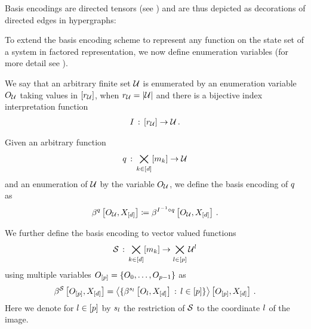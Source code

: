 Basis encodings are directed tensors (see ) and are thus depicted as decorations of directed edges in hypergraphs:
\begin{center}
	
\end{center}

To extend the basis encoding scheme to represent any function on the state set of a system in factored representation, we now define enumeration variables (for more detail see ).

\begin{definition}\label{def:indexinterpretationNotation}
    We say that an arbitrary finite set $\mathcal{U}$ is enumerated by an enumeration variable $O_{\mathcal{U}}$ taking values in $[r_{\mathcal{U}}]$, when $r_{\mathcal{U}}=\left|\mathcal{U}\right|$ and there is a bijective index interpretation function
    \begin{align*}
        I \,:\, [r_{\mathcal{U}}] \rightarrow \mathcal{U} \, .
    \end{align*}
\end{definition}

Given an arbitrary function
\begin{align*}
	q \,:\, \bigtimes_{k\in[d]}[m_{k}] \rightarrow \mathcal{U}
\end{align*}
and an enumeration of $\mathcal{U}$ by the variable $O_{\mathcal{U}}$, we define the basis encoding of $q$ as
\begin{align*}
	\beta^{q}\left[O_{\mathcal{U}},X_{[d]}\right]
	\coloneqq \beta^{I^{-1}\circ q}\left[O_{\mathcal{U}},X_{[d]}\right] \, .
\end{align*}

We further define the basis encoding to vector valued functions
\begin{align*}
	\mathcal{S} \,:\, \bigtimes_{k\in[d]}[m_{k}] \rightarrow \bigtimes_{l\in[p]} \mathcal{U}^{l}
\end{align*}
using multiple variables $O_{[p]}=\{O_{0},\ldots,O_{p-1}\}$ as
\begin{align*}
	\beta^{\mathcal{S}}\left[O_{[p]},X_{[d]}\right]
	= \left\langle \{\beta^{s_{l}}\left[O_{l},X_{[d]}\right]\,:\,l\in[p]\}\right\rangle \left[ O_{[p]},X_{[d]} \right] \, .
\end{align*}
Here we denote for $l\in[p]$ by $s_{l}$ the restriction of $\mathcal{S}$ to the coordinate $l$ of the image.

